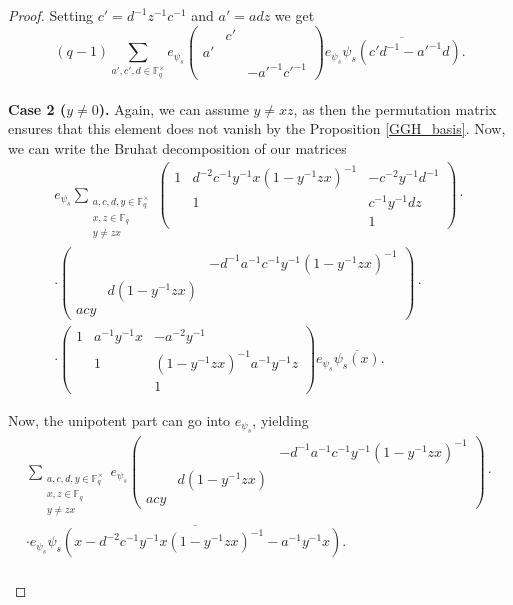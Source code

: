 \documentclass[12pt,reqno]{amsart}
\theoremstyle{definition}
\theoremstyle{remark}
\numberwithin{equation}{section}
\begin{document}
\begin{proof}
    Setting $c' = d^{-1}z^{-1}c^{-1}$ and $a' = adz$ we get
    \begin{equation*}
        (q-1)\sum_{a', c', d \in \mathbb{F}_q^\times}e_{\psi_s}
        \begin{pmatrix}
            & c' &\\
            a' & & \\
            & & -a'^{-1}c'^{-1}
        \end{pmatrix}e_{\psi_s} \overline{\psi_s(c'd^{-1}-a'^{-1}d)}.
    \end{equation*}\\
    
    \textbf{Case 2 ($y \ne 0$).} Again, we can assume $y \ne xz$, as then the permutation matrix ensures that this element does not vanish by the Proposition \ref{GGH_basis}. Now, we can write the Bruhat decomposition of our matrices
    \begin{align*}
        e_{\psi_s} \sum_{\substack{a, c, d, y \in \mathbb{F}_q^\times\\x, z \in \mathbb{F}_q\\ y \ne zx}} \begin{pmatrix}
            1 & d^{-2}c^{-1}y^{-1}x(1-y^{-1}zx)^{-1} & -c^{-2}y^{-1}d^{-1}\\
            & 1 & c^{-1}y^{-1}dz\\
            & & 1
        \end{pmatrix} \cdot \\ \cdot \begin{pmatrix}
            & & -d^{-1}a^{-1}c^{-1}y^{-1}(1-y^{-1}zx)^{-1}\\
            & d(1-y^{-1}zx) &\\
            acy & &
        \end{pmatrix} \cdot \\ \cdot \begin{pmatrix}
            1 & a^{-1}y^{-1}x & -a^{-2}y^{-1}\\
            & 1 & (1-y^{-1}zx)^{-1}a^{-1}y^{-1}z\\
            & & 1
        \end{pmatrix} e_{\psi_s} \overline{\psi_s(x)}.
    \end{align*}

    Now, the unipotent part can go into $e_{\psi_s}$, yielding
    \begin{multline*}
        \sum_{\substack{a, c, d, y \in \mathbb{F}_q^\times\\x, z \in \mathbb{F}_q\\ y \ne zx}}e_{\psi_s}\begin{pmatrix}
            & & -d^{-1}a^{-1}c^{-1}y^{-1}(1-y^{-1}zx)^{-1}\\
            & d(1-y^{-1}zx) &\\
            acy & &
        \end{pmatrix}\cdot \\ \cdot e_{\psi_s} \overline{\psi_s(x - d^{-2}c^{-1}y^{-1}x(1-y^{-1}zx)^{-1} - a^{-1}y^{-1}x)}.
    \end{multline*}\\
    

\end{proof}
\end{document}
